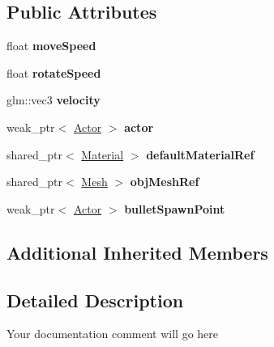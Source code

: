 \subsection*{Public Attributes}
\begin{DoxyCompactItemize}
\item 
\hypertarget{class_player_script_ab3f3425c6c4e785c1b383372aa00cf2f}{}float {\bfseries move\+Speed}\label{class_player_script_ab3f3425c6c4e785c1b383372aa00cf2f}

\item 
\hypertarget{class_player_script_aa4c7eaaa33783dabfa9d78ca39ac711c}{}float {\bfseries rotate\+Speed}\label{class_player_script_aa4c7eaaa33783dabfa9d78ca39ac711c}

\item 
\hypertarget{class_player_script_a2f26a76ff6fbddb85a57271154e09c34}{}glm\+::vec3 {\bfseries velocity}\label{class_player_script_a2f26a76ff6fbddb85a57271154e09c34}

\item 
\hypertarget{class_player_script_a634f7d6cc4a865ba9f39c348f3d24554}{}weak\+\_\+ptr$<$ \hyperlink{class_actor}{Actor} $>$ {\bfseries actor}\label{class_player_script_a634f7d6cc4a865ba9f39c348f3d24554}

\item 
\hypertarget{class_player_script_ad9ef6dbd52d8b5b81225cd0c13120344}{}shared\+\_\+ptr$<$ \hyperlink{class_material}{Material} $>$ {\bfseries default\+Material\+Ref}\label{class_player_script_ad9ef6dbd52d8b5b81225cd0c13120344}

\item 
\hypertarget{class_player_script_a8d35b4540064e7b2e26b985a1b2db017}{}shared\+\_\+ptr$<$ \hyperlink{class_mesh}{Mesh} $>$ {\bfseries obj\+Mesh\+Ref}\label{class_player_script_a8d35b4540064e7b2e26b985a1b2db017}

\item 
\hypertarget{class_player_script_a78fce4a74b7e1e0875e407f5b8c4117b}{}weak\+\_\+ptr$<$ \hyperlink{class_actor}{Actor} $>$ {\bfseries bullet\+Spawn\+Point}\label{class_player_script_a78fce4a74b7e1e0875e407f5b8c4117b}

\end{DoxyCompactItemize}
\subsection*{Additional Inherited Members}


\subsection{Detailed Description}
Your documentation comment will go here 

